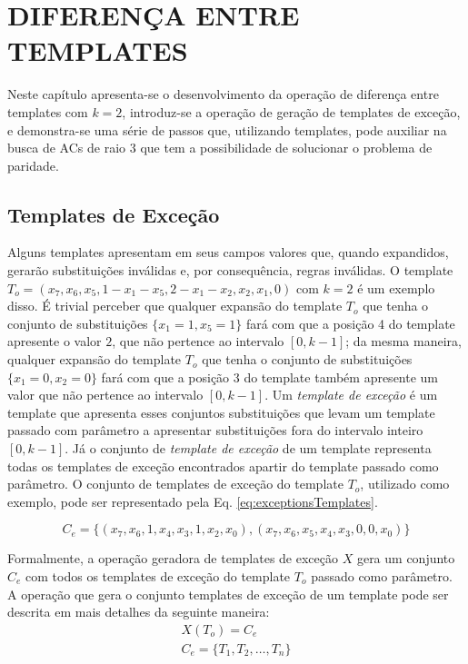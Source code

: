 \section{DIFERENÇA ENTRE TEMPLATES}
\label{sec:resultadosParciais}
Neste capítulo apresenta-se o desenvolvimento da operação de diferença entre templates com $k=2$, introduz-se a operação de geração de templates de exceção, e demonstra-se uma série de passos que, utilizando templates, pode auxiliar na busca de ACs de raio 3 que tem a possibilidade de solucionar o problema de paridade.

\subsection{Templates de Exceção}
Alguns templates apresentam em seus campos valores que, quando expandidos, gerarão substituições inválidas e, por consequência, regras inválidas. O template $T_o = (x_7, x_6, x_5, 1 - x_1 - x_5, 2 - x_1 - x_2, x_2, x_1, 0)$ com $k=2$ é um exemplo disso. É trivial perceber que qualquer expansão do template $T_o$ que tenha o conjunto de substituições $\{x_1 = 1, x_5 = 1\}$ fará com que a posição 4 do template apresente o valor $2$, que não pertence ao intervalo $[0,k-1]$; da mesma maneira, qualquer expansão do template $T_o$ que tenha o conjunto de substituições $\{x_1 = 0, x_2 = 0\}$ fará com que a posição 3 do template também apresente um valor que não pertence ao intervalo $[0,k-1]$. Um \textit{template de exceção} é um template que apresenta esses conjuntos substituições que levam um template passado com parâmetro a apresentar substituições fora do intervalo inteiro $[0, k-1]$. Já o conjunto de \textit{template de exceção} de um template representa todas os templates de exceção encontrados apartir do template passado como parâmetro. O conjunto de templates de exceção do template $T_o$, utilizado como exemplo, pode ser representado pela Eq. \ref{eq:exceptionsTemplates}.

\begin{equation}
C_e = \{(x_7, x_6, 1, x_4, x_3, 1, x_2, x_0),(x_7, x_6, x_5, x_4, x_3, 0, 0, x_0)\}
\label{eq:exceptionsTemplates}
\end{equation}

Formalmente, a operação geradora de templates de exceção $X$ gera um conjunto $C_e$ com todos os templates de exceção do template $T_o$ passado como parâmetro. A operação que gera o conjunto templates de exceção de um template pode ser descrita em mais detalhes da seguinte maneira:
\begin{equation}
\begin{split}
X(T_o)= C_e \\
C_e = \{T_1,T_2,\dots, T_n\}\\
\end{split}
\end{equation}

